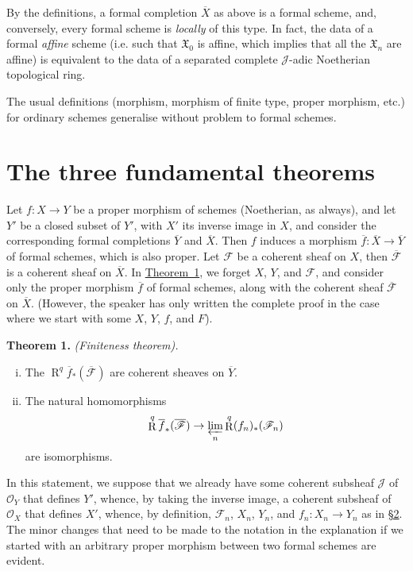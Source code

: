 \documentclass{article}
\newenvironment{itenv}[1]
  {\phantomsection\par\medskip\noindent\textbf{#1.}\itshape}
  {\medskip}
\newcommand{\scr}[1]{{\mathscr{#1}}}
\newcommand{\fk}{\mathfrak}
\DeclareMathOperator{\RR}{R}
\begin{document}
By the definitions, a formal completion $\overline{X}$ as above is a formal scheme, and, conversely, every formal scheme is \emph{locally} of this type.
In fact, the data of a formal \emph{affine} scheme (i.e. such that $\fk{X}_0$ is affine, which implies that all the $\fk{X}_n$ are affine) is equivalent to the data of a separated complete $\scr{J}$-adic Noetherian topological ring.

The usual definitions (morphism, morphism of finite type, proper morphism, etc.) for ordinary schemes generalise without problem to formal schemes.


\section{The three fundamental theorems}
\label{section3}

Let $f\colon X\to Y$ be a proper morphism of schemes (Noetherian, as always), and let $Y'$ be a closed subset of $Y'$, with $X'$ its inverse image in $X$, and consider the corresponding formal completions $\overline{Y}$ and $\overline{X}$.
Then $f$ induces a morphism $\overline{f}\colon\overline{X}\to\overline{Y}$ of formal schemes, which is also proper.
Let $\scr{F}$ be a coherent sheaf on $X$, then $\overline{\scr{F}}$ is a coherent sheaf on $\overline{X}$.
In \hyperref[theorem1]{Theorem~1}, we forget $X$, $Y$, and $\scr{F}$, and consider only the proper morphism $\overline{f}$ of formal schemes, along with the coherent sheaf $\overline{\scr{F}}$ on $\overline{X}$.
(However, the speaker has only written the complete proof in the case where we start with some $X$, $Y$, $f$, and $F$).

\begin{itenv}{Theorem 1}
\label{theorem1}
  \emph{(Finiteness theorem).}
  \begin{enumerate}[i.]
    \item The $\RR^q\overline{f}_*(\overline{\scr{F}})$ are coherent sheaves on $\overline{Y}$.
    \item The natural homomorphisms
      \[
        \RR^q\overline{f}_*(\overline{\scr{F}}) \to \varprojlim_n\RR^q (f_n)_*(\scr{F}_n)
      \]
      are isomorphisms.
  \end{enumerate}
\end{itenv}

In this statement, we suppose that we already have some coherent subsheaf $\scr{J}$ of $\scr{O}_Y$ that defines $Y'$, whence, by taking the inverse image, a coherent subsheaf of $\scr{O}_X$ that defines $X'$, whence, by definition, $\scr{F}_n$, $X_n$, $Y_n$, and $f_n\colon X_n\to Y_n$ as in \hyperref[section2]{\S2}.
The minor changes that need to be made to the notation in the explanation if we started with an arbitrary proper morphism between two formal schemes are evident.
\end{document}
